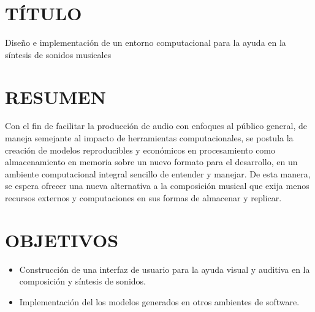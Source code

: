 \documentclass{book}
\begin{document}
	\thispagestyle{empty}
	\frontmatter
	
	\section*{TÍTULO}
	\Large{Diseño e implementación de un entorno computacional para la ayuda en la síntesis de sonidos musicales}
	\section*{RESUMEN}
	Con el fin de facilitar la producción de audio con enfoques al público general, de maneja semejante al impacto de herramientas computacionales, se postula la creación de modelos reproducibles y económicos en procesamiento como almacenamiento en memoria sobre un nuevo formato para el desarrollo, en un ambiente computacional integral sencillo de entender y manejar. De esta manera, se espera ofrecer una nueva alternativa a la composición musical que exija menos recursos externos y computaciones en sus formas de almacenar y replicar.
	\section*{OBJETIVOS}
	\begin{itemize}
		\item Construcción de una interfaz de usuario para la ayuda visual y auditiva en la composición y síntesis de sonidos.
		\item Implementación del los modelos generados en otros ambientes de software.
	\end{itemize}
	
\end{document}

